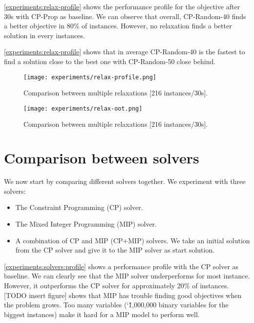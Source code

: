 \documentclass[../../thesis.tex]{subfiles}
\begin{document}
\autoref{experiments:relax-profile} shows the performance profile for the objective after 30s with 
CP-Prop as baseline.
We can observe that overall, CP-Random-40 finds a better objective in 80\% of instances. However,
no relaxation finds a better solution in every instances. 


\autoref{experiments:relax-profile} shows that in average CP-Random-40 is the fastest to find a solution close 
to the best one with CP-Random-50 close behind.

\begin{figure}
  \centering
  \texttt{[image: experiments/relax-profile.png]}
  \caption{Comparison between multiple relaxations [216 instances/30s].}
  \label{experiments:relax-profile}
\end{figure}

\begin{figure}
  \centering
  \texttt{[image: experiments/relax-oot.png]}
  \caption{Comparison between multiple relaxations [216 instances/30s].}
  \label{experiments:relax-oot}
\end{figure}




\section{Comparison between solvers}

We now start by comparing different solvers together. We experiment with three solvers: 

\begin{itemize}
  \item The Constraint Programming (CP) solver.
  \item The Mixed Integer Programming (MIP) solver.
  \item A combination of CP and MIP (CP+MIP) solvers. We take an initial solution from the CP solver 
  and give it to the MIP solver as start solution. 
\end{itemize}



\autoref{experiments:solvers:profile} 
shows a performance profile with the CP solver as baseline. We can clearly see that 
the MIP solver underperforms for most instance. However, it outperforms the CP solver for approximately
20\% of instances. [TODO insert figure] shows that MIP has trouble finding good objectives when the 
problem grows. Too many variables (\char`\~ 1,000,000 binary variables for the biggest instances) make it hard for a MIP model to perform well.
\end{document}
